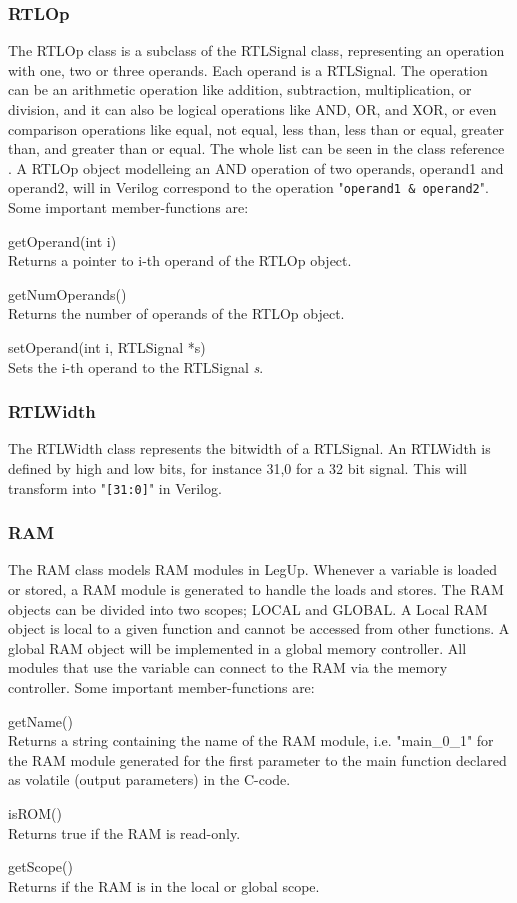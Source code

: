 \subsubsection{RTLOp}
The RTLOp class is a subclass of the RTLSignal class, representing an operation with one, two or three operands. Each operand is a RTLSignal. The operation can be an arithmetic operation like addition, subtraction, multiplication, or division, and it can also be logical operations like AND, OR, and XOR, or even comparison operations like equal, not equal, less than, less than or equal, greater than, and greater than or equal. The whole list can be seen in the class reference \cite{rtlopclassref}. A RTLOp object modelleing an AND operation of two operands, operand1 and operand2, will in Verilog correspond to the operation "\verb!operand1 & operand2!". Some important member-functions are:
\begin{compactdesc}
    \item[getOperand(int i)] \hfill \\
    Returns a pointer to i-th operand of the RTLOp object.
    \item[getNumOperands()] \hfill \\
    Returns the number of operands of the RTLOp object.
    \item[setOperand(int i, RTLSignal *s)] \hfill \\
    Sets the i-th operand to the RTLSignal \textit{s}.
\end{compactdesc}
\subsubsection{RTLWidth}
The RTLWidth class represents the bitwidth of a RTLSignal. An RTLWidth is defined by high and low bits, for instance 31,0 for a 32 bit signal. This will transform into "\verb![31:0]!" in Verilog.
\subsubsection{RAM}
The RAM class models RAM modules in LegUp. Whenever a variable is loaded or stored, a RAM module is generated to handle the loads and stores. The RAM objects can be divided into two scopes; LOCAL and GLOBAL. A Local RAM object is local to a given function and cannot be accessed from other functions. A global RAM object will be implemented in a global memory controller. All modules that use the variable can connect to the RAM via the memory controller. Some important member-functions are:
\begin{compactdesc}
    \item[getName()] \hfill \\
    Returns a string containing the name of the RAM module, i.e. "main\_0\_1" for the RAM module generated for the first parameter to the main function declared as volatile (output parameters) in the C-code.
    \item[isROM()] \hfill \\
    Returns true if the RAM is read-only.
    \item[getScope()] \hfill \\
    Returns if the RAM is in the local or global scope.
\end{compactdesc}


